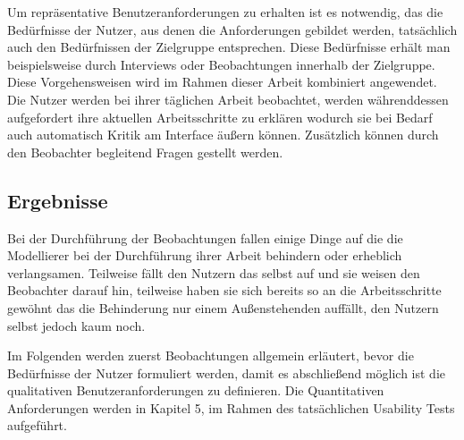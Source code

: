Um repräsentative Benutzeranforderungen zu erhalten ist es notwendig, das die Bedürfnisse der Nutzer, aus denen die Anforderungen gebildet werden, tatsächlich auch den Bedürfnissen der Zielgruppe entsprechen.
Diese Bedürfnisse erhält man beispielsweise durch Interviews oder Beobachtungen innerhalb der Zielgruppe.
Diese Vorgehensweisen wird im Rahmen dieser Arbeit kombiniert angewendet.
Die Nutzer werden bei ihrer täglichen Arbeit beobachtet, werden währenddessen aufgefordert ihre aktuellen Arbeitsschritte zu erklären wodurch sie bei Bedarf auch automatisch Kritik am Interface äußern können.
Zusätzlich können durch den Beobachter begleitend Fragen gestellt werden.

\subsection{Ergebnisse}

Bei der Durchführung der Beobachtungen fallen einige Dinge auf die die Modellierer bei der Durchführung ihrer Arbeit behindern oder erheblich verlangsamen.
Teilweise fällt den Nutzern das selbst auf und sie weisen den Beobachter darauf hin, teilweise haben sie sich bereits so an die Arbeitsschritte gewöhnt das die Behinderung nur einem Außenstehenden auffällt, den Nutzern selbst jedoch kaum noch.

Im Folgenden werden zuerst Beobachtungen allgemein erläutert, bevor die Bedürfnisse der Nutzer formuliert werden, damit es abschließend möglich ist die qualitativen Benutzeranforderungen zu definieren.
Die Quantitativen Anforderungen werden in Kapitel 5, im Rahmen des tatsächlichen Usability Tests aufgeführt.

